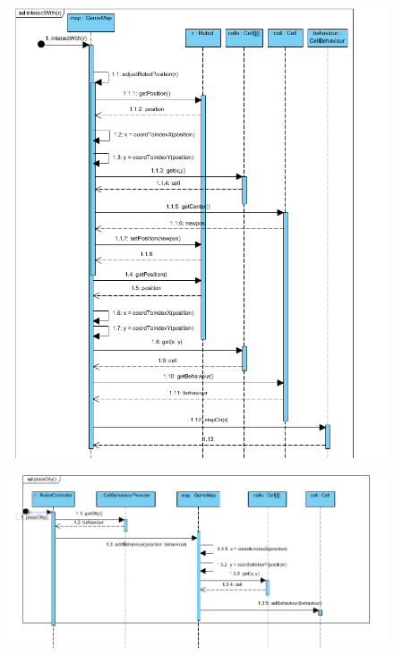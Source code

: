 \begin{figure}[!htbp]
	\begin{center}
		\includegraphics[width=180mm, center]{./chapters/chapter03/iw.png}
		\caption{}
	\end{center}
\end{figure}

\begin{figure}[!htbp]
	\begin{center}
		\includegraphics[width=180mm, center]{./chapters/chapter03/oily.png}
		\caption{}
	\end{center}
\end{figure}

